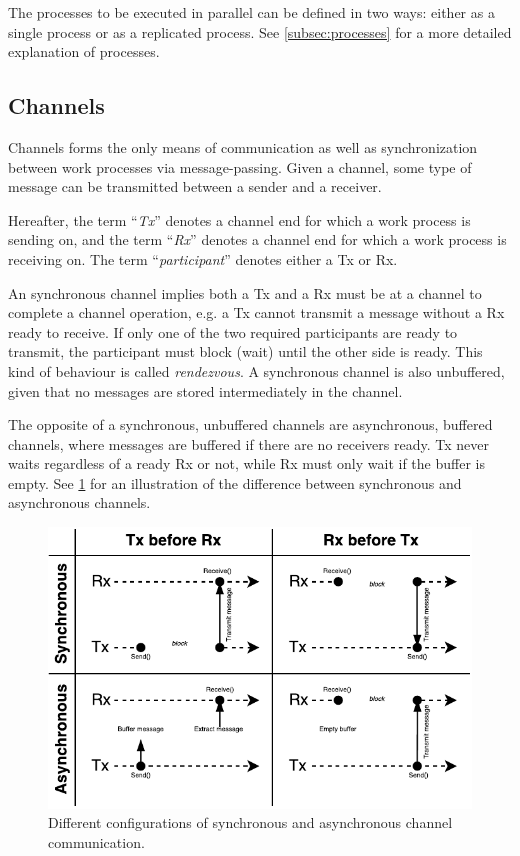 The processes to be executed in parallel can be defined in two ways: either as a single process or as a replicated process. See \cref{subsec:processes} for a more detailed explanation of processes. 

\subsection{Channels}
\label{subsec:channel_design}


Channels forms the only means of communication as well as synchronization between work processes via message\hyp{}passing. Given a channel, some type of message can be transmitted between a sender and a receiver.

Hereafter, the term ``\textit{Tx}'' denotes a channel end for which a work process is sending on, and the term ``\textit{Rx}'' denotes a channel end for which a work process is receiving on. The term ``\textit{participant}'' denotes either a Tx or Rx.

An synchronous channel implies both a Tx and a Rx must be at a channel to complete a channel operation, e.g. a Tx cannot transmit a message without a Rx ready to receive. If only one of the two required participants are ready to transmit, the participant must block (wait) until the other side is ready. This kind of behaviour is called \textit{rendezvous}. A synchronous channel is also unbuffered, given that no messages are stored intermediately in the channel.

The opposite of a synchronous, unbuffered channels are asynchronous, buffered channels, where messages are buffered if there are no receivers ready. Tx never waits regardless of a ready Rx or not, while Rx must only wait if the buffer is empty. See \cref{fig:channel_sync_async} for an illustration of the difference between synchronous and asynchronous channels.

\begin{figure}[h!]
    \centering
    \includegraphics[width=1\linewidth]{fig/channel_sync_async}
    \caption{Different configurations of synchronous and asynchronous channel communication.}
    \label{fig:channel_sync_async}
\end{figure}

